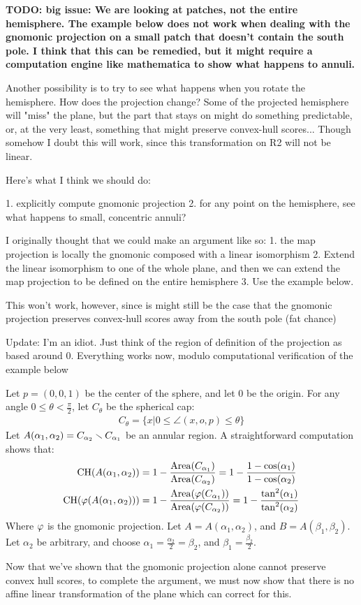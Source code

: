 {\bf
TODO: big issue: We are looking at patches, not the entire hemisphere. 
The example below does not work when dealing with the gnomonic 
projection on a small patch that doesn't contain the south pole. 
I think that this can be remedied, but it might require a 
computation engine like mathematica to show what happens to annuli. 

Another possibility is to try to see what happens when you rotate 
the hemisphere. How does the projection change? Some of the projected 
hemisphere will "miss" the plane, but the part that stays on might do 
something predictable, or, at the very least, something that might 
preserve convex-hull scores... Though somehow I doubt this will work, 
since this transformation on R2 will not be linear.

Here's what I think we should do:

1. explicitly compute gnomonic projection
2. for any point on the hemisphere, see what happens to small, 
concentric annuli?

I originally thought that we could make an argument like so:
1. the map projection is locally the gnomonic composed with a linear 
isomorphism
2. Extend the linear isomorphism to one of the whole plane, and then 
we can extend the map projection to be defined on the entire hemisphere
3. Use the example below.

This won't work, however, since is might still be the case that 
the gnomonic projection preserves convex-hull scores away from the 
south pole (fat chance)

Update: I'm an idiot. Just think of the region of definition of 
the projection as based around $0$. Everything works now, modulo 
computational verification of the example below
}
\begin{example}
  Let $p = (0,0,1)$ be the center of the sphere, and let $0$ be the
  origin. For any angle $0\le \theta< \frac\pi2$, let $C_\theta$ be
  the spherical cap:
  \begin{align*}
    C_{\theta} = \{x|0\le\angle(x,o,p)\le \theta\}
  \end{align*}
  Let $A(\alpha_1,\alpha_2) = C_{\alpha_2}\smallsetminus C_{\alpha_1}$ be 
  an annular region. A straightforward computation shows that:
  \begin{align*}
    \mathrm{CH}(A(\alpha_1,\alpha_2)) &= 
    1-\frac{\mathrm{Area}(C_{\alpha_1})}{\mathrm{Area}(C_{\alpha_2})}
    =1- \frac{1-\cos(\alpha_1)}{1-\cos(\alpha_2)}\\
    \mathrm{CH}(\vphi(A(\alpha_1,\alpha_2))) &=
    1-\frac{\mathrm{Area}(\vphi(C_{\alpha_1}))}%
    {\mathrm{Area}(\vphi(C_{\alpha_2}))}
      =1- \frac{\tan^2(\alpha_1)}{\tan^2(\alpha_2)}
  \end{align*}
  Where $\varphi$ is the gnomonic projection. 
  Let $A=A(\alpha_1,\alpha_2)$, and $B = A(\beta_1,\beta_2)$. 
  Let $\alpha_2$ be arbitrary, and choose 
  $\alpha_1 = \frac{\alpha_2}{2} = \beta_2$, and 
  $\beta_1 = \frac{\beta_2}{2}$. 
  
\end{example}
Now that we've shown that the gnomonic projection alone cannot
preserve convex hull scores, to complete the argument, we must now
show that there is no affine linear transformation of the plane which
can correct for this.

